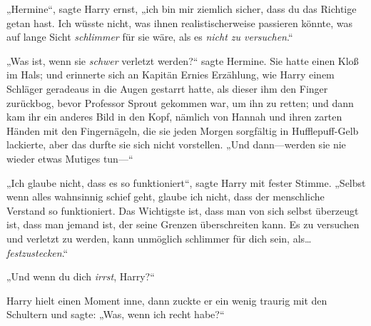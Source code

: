 „Hermine“, sagte Harry ernst, „ich bin mir ziemlich sicher, dass du das Richtige getan hast. Ich wüsste nicht, was ihnen realistischerweise passieren könnte, was auf lange Sicht \emph{schlimmer} für sie wäre, als es \emph{nicht zu versuchen}.“

„Was ist, wenn sie \emph{schwer} verletzt werden?“ sagte Hermine. Sie hatte einen Kloß im Hals; und erinnerte sich an Kapitän Ernies Erzählung, wie Harry einem Schläger geradeaus in die Augen gestarrt hatte, als dieser ihm den Finger zurückbog, bevor Professor Sprout gekommen war, um ihn zu retten; und dann kam ihr ein anderes Bild in den Kopf, nämlich von Hannah und ihren zarten Händen mit den Fingernägeln, die sie jeden Morgen sorgfältig in Hufflepuff-Gelb lackierte, aber das durfte sie sich nicht vorstellen. „Und dann—werden sie nie wieder etwas Mutiges tun—“

„Ich glaube nicht, dass es so funktioniert“, sagte Harry mit fester Stimme. „Selbst wenn alles wahnsinnig schief geht, glaube ich nicht, dass der menschliche Verstand so funktioniert. Das Wichtigste ist, dass man von sich selbst überzeugt ist, dass man jemand ist, der seine Grenzen überschreiten kann. Es zu versuchen und verletzt zu werden, kann unmöglich schlimmer für dich sein, als…\emph{festzustecken}.“

„Und wenn du dich \emph{irrst}, Harry?“

Harry hielt einen Moment inne, dann zuckte er ein wenig traurig mit den Schultern und sagte: „Was, wenn ich recht habe?“

